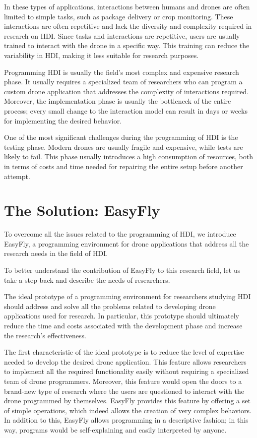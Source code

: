 In these types of applications, interactions between humans and drones are often limited to simple tasks, such as package
delivery or crop monitoring. These interactions are often repetitive and lack the diversity and complexity required in
research on HDI. Since tasks and interactions are repetitive, users are usually trained to interact with the drone
in a specific way. This training can reduce the variability in HDI, making it less suitable for research purposes.

Programming HDI is usually the field's most complex and expensive research phase. It usually requires
a specialized team of researchers who can program a custom drone application that addresses the complexity of interactions
required. Moreover, the implementation phase is usually the bottleneck of the entire process; every small change to
the interaction model can result in days or weeks for implementing the desired behavior.

One of the most significant challenges during the programming of HDI is the testing phase. Modern drones are
usually fragile and expensive, while tests are likely to fail. This phase usually introduces a high consumption of resources, 
both in terms of costs and time needed for repairing the entire setup before another attempt.


\section{The Solution: EasyFly}\label{sec:the_solution}
To overcome all the issues related to the programming of HDI, we introduce EasyFly, a programming environment for
drone applications that address all the research needs in the field of HDI.

To better understand the contribution of EasyFly to this research field, let us take a step back and describe the needs of researchers.

The ideal prototype of a programming environment for researchers studying HDI should address and solve all the problems
related to developing drone applications used for research. 
In particular, this prototype should ultimately reduce the time and costs associated with the development phase and increase the research's effectiveness.

The first characteristic of the ideal prototype is to reduce the level of expertise needed to develop the desired drone
application. This feature allows researchers to implement all the required functionality easily without requiring
a specialized team of drone programmers. Moreover, this feature would open the doors to a brand-new type of research where
the users are questioned to interact with the drone programmed by themselves.
EasyFly provides this feature by offering a set of simple operations, which indeed allows the creation of very complex behaviors.
In addition to this, EasyFly allows programming in a descriptive fashion; in this way, programs would be self-explaining
and easily interpreted by anyone.

